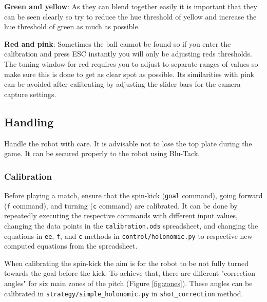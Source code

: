\documentclass[a4paper,12pt]{article}
\begin{document}
\textbf{Green and yellow}: As they can blend together easily it is important that they can be seen clearly so try to reduce the hue threshold of yellow and increase the hue threshold of green as much as possible. 

\textbf{Red and pink}: Sometimes the ball cannot be found so if you enter the calibration and press ESC instantly you will only be adjusting reds thresholds. The tuning window for red requires you to adjust to separate ranges of values so make sure this is done to get as clear spot as possible.  Its similarities with pink can be avoided after calibrating by adjusting the slider bars for the camera capture settings.      

\subsection{Handling} \label{handling}

Handle the robot with care. It is advisable not to lose the top plate during the game. It can be secured properly to the robot using Blu-Tack. 

\subsubsection{Calibration}

Before playing a match, ensure that the spin-kick (\texttt{goal} command), going forward (\texttt{f} command), and turning (\texttt{c} command) are calibrated. It can be done by repeatedly executing the respective commands with different input values, changing the data points in the \texttt{calibration.ods} spreadsheet, and changing the equations in \texttt{ee}, \texttt{f}, and \texttt{c} methods in \texttt{control/holonomic.py} to respective new computed equations from the spreadsheet. 

When calibrating the spin-kick the aim is for the robot to be not fully turned towards the goal before the kick. To achieve that, there are different "correction angles" for six main zones of the pitch (Figure  \ref{fig:zones}). These angles can be calibrated in \texttt{strategy/simple\_holonomic.py} in \texttt{shot\_correction} method.
\end{document}
